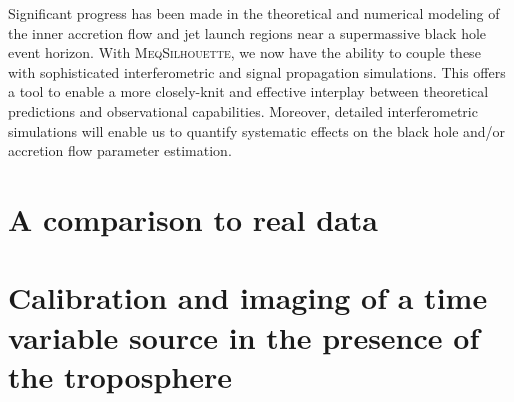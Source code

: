 Significant progress has been made in the theoretical and numerical modeling of the inner accretion flow and jet launch regions near a supermassive black hole event horizon. With \textsc{MeqSilhouette}, we now have the ability to couple these with sophisticated interferometric and signal propagation simulations. This offers a tool to enable a more closely-knit and effective interplay between theoretical predictions and observational capabilities. Moreover, detailed interferometric simulations will enable us to quantify systematic effects on the black hole and/or accretion flow parameter estimation.
 

\section{A comparison to real data}

\section{Calibration and imaging of a time variable source in the presence of the troposphere}



